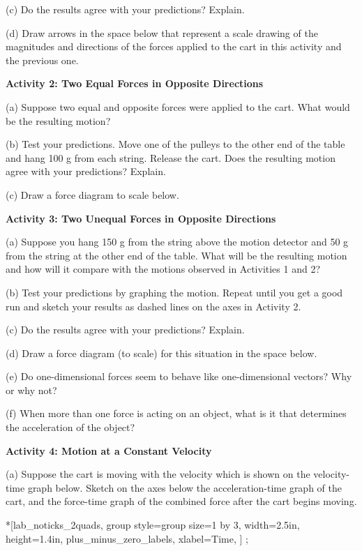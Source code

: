 (c) Do the results agree with your predictions? Explain.
\answerspace{30mm}

(d) Draw arrows in the space below that represent a scale drawing of the magnitudes
and directions of the forces applied to the cart in this activity and the previous
one.
\answerspace{30mm}

\pagebreak[3]
\textbf{Activity 2: Two Equal Forces in Opposite Directions}

(a) Suppose two equal and opposite forces were applied to the cart. What would
be the resulting motion?
\answerspace{10mm}

\pagebreak[2]
(b) Test your predictions. Move one of the pulleys to the other end of the table
and hang 100 g from each string. Release the cart. Does the resulting motion
agree with your predictions? Explain.
\answerspace{20mm}

(c) Draw a force diagram to scale below.
\answerspace{20mm}

\textbf{Activity 3: Two Unequal Forces in Opposite Directions}

(a) Suppose you hang 150 g from the string above the motion detector and 50
g from the string at the other end of the table. What will be the resulting
motion and how will it compare with the motions observed in Activities 1 and
2?
\answerspace{20mm}

(b) Test your predictions by graphing the motion. Repeat until you get a good
run and sketch your results as dashed lines on the axes in Activity 2.

(c) Do the results agree with your predictions? Explain.
\answerspace{20mm}

(d) Draw a force diagram (to scale) for this situation in the space below.
\vspace{10mm}

(e) Do one-dimensional forces seem to behave like one-dimensional vectors? Why
or why not?
\answerspace{20mm}

(f) When more than one force is acting on an object, what is it that determines
the acceleration of the object?
\answerspace{20mm}

\pagebreak[2]
\textbf{Activity 4: Motion at a Constant Velocity}

(a) Suppose the cart is moving with the velocity which is shown on the velocity-time
graph below. Sketch on the axes below the acceleration-time graph of the cart,
and the force-time graph of the combined force after the cart begins moving.

\begin{lab_groupplot}*{}[lab_noticks_2quads,
	group style={group size=1 by 3},
	width=2.5in,  height=1.4in,
	plus_minus_zero_labels,
	xlabel=Time,
	]
\nextgroupplot[ylabel=Velocity,]
	;
\nextgroupplot[ylabel=Acceleration,]
\nextgroupplot[ylabel=Force,]
\end{lab_groupplot}

